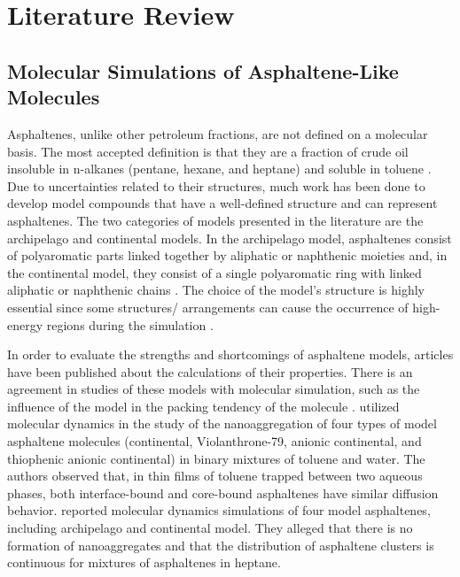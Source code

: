 
\chapter{Literature Review} %
\label{Chapter2} %
\section{Molecular Simulations of Asphaltene-Like Molecules}

Asphaltenes, unlike other petroleum fractions, are not defined on a molecular basis. The most accepted definition is that they are a fraction of crude oil insoluble in n-alkanes (pentane, hexane, and heptane) and soluble in toluene \cite{SJOBLOM2003399}. Due to uncertainties related to their structures, much work has been done to develop model compounds that have a well-defined structure and can represent asphaltenes. The two categories of models presented in the literature are the archipelago and continental models. In the archipelago model, asphaltenes consist of polyaromatic parts linked together by aliphatic or naphthenic moieties and, in the continental model, they consist of a single
polyaromatic ring with linked aliphatic or naphthenic chains \cite{doi:10.1021/ef900975e,doi:10.1080/0892702031000148762}. The choice of the model's structure is highly essential since some structures/ arrangements can cause the occurrence of high-energy regions during the simulation \cite{doi:10.1021/ef200507c} .   

In order to evaluate the strengths and shortcomings of asphaltene models, articles have been published about the calculations of their properties. There is an agreement in studies of these models with molecular simulation, such as the influence of the model in the packing tendency of the molecule \cite{doi:10.1080/10298436.2011.575141}.  utilized molecular dynamics in the study of the nanoaggregation of four types of model asphaltene molecules (continental, Violanthrone-79, anionic continental, and thiophenic anionic continental) in binary mixtures of toluene and water. The authors observed that, in thin films of toluene trapped between two aqueous phases, both interface-bound and core-bound asphaltenes have similar diffusion behavior.  reported molecular dynamics simulations of four model asphaltenes, including archipelago and continental model. They alleged that there is no formation of nanoaggregates and that the distribution of asphaltene clusters is continuous for mixtures of asphaltenes in heptane. 

